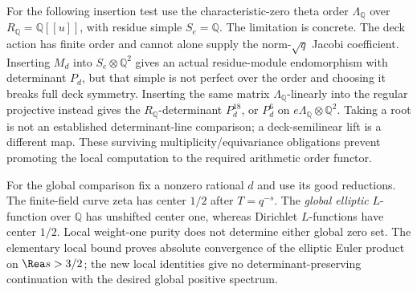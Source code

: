 \documentclass[11pt,oneside,openany]{book}
\theoremstyle{definition}\newtheorem{definition}[theorem]{Definition}
\theoremstyle{remark}\newtheorem{remark}[theorem]{Remark}
\begin{document}
For the following insertion test use the characteristic-zero theta order $\Lambda_{\mathbb{Q}}$ over $R_{\mathbb{Q}}=\mathbb{Q}[[u]]$, with residue simple $S_e=\mathbb{Q}$. The limitation is concrete. The deck action has finite order and cannot alone supply the norm-$\sqrt q$ Jacobi coefficient. Inserting $M_d$ into $S_e\otimes\mathbb{Q}^2$ gives an actual residue-module endomorphism with determinant $P_d$, but that simple is not perfect over the order and choosing it breaks full deck symmetry. Inserting the same matrix $\Lambda_{\mathbb{Q}}$-linearly into the regular projective instead gives the $R_{\mathbb{Q}}$-determinant $P_d^{18}$, or $P_d^6$ on $e\Lambda_{\mathbb{Q}}\otimes\mathbb{Q}^2$. Taking a root is not an established determinant-line comparison; a deck-semilinear lift is a different map. These surviving multiplicity/equivariance obligations prevent promoting the local computation to the required arithmetic order functor.

For the global comparison fix a nonzero rational $d$ and use its good reductions. The finite-field curve zeta has center $1/2$ after $T=q^{-s}$. The \emph{global elliptic} $L$-function over $\mathbb{Q}$ has unshifted center one, whereas Dirichlet $L$-functions have center $1/2$. Local weight-one purity does not determine either global zero set. The elementary local bound proves absolute convergence of the elliptic Euler product on $\Rea s>3/2$; the new local identities give no determinant-preserving continuation with the desired global positive spectrum.
\end{document}
